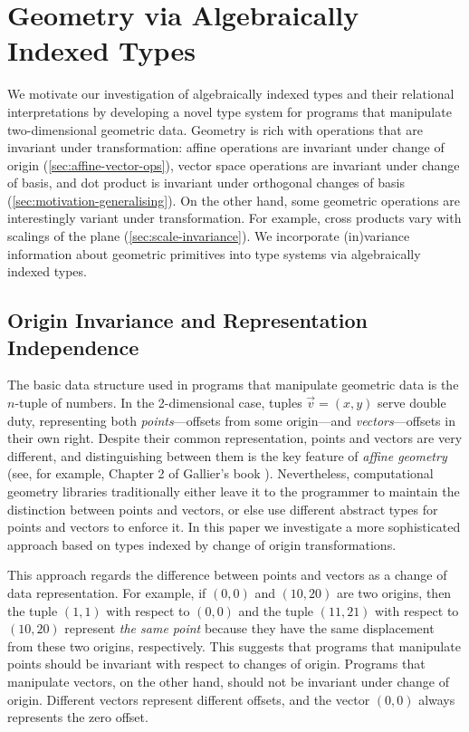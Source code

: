 \section{Geometry via Algebraically Indexed Types}
\label{sec:motivating-examples}

We motivate our investigation of algebraically indexed types and their
relational interpretations by developing a novel type system for
programs that manipulate two-dimensional geometric data. Geometry is
rich with operations that are invariant under transformation: affine
operations are invariant under change of origin
(\autoref{sec:affine-vector-ops}), vector space operations are
invariant under change of basis, and dot product is invariant under
orthogonal changes of basis
(\autoref{sec:motivation-generalising}). On the other hand, some
geometric operations are interestingly variant under transformation.
For example, cross products vary with scalings of the plane
(\autoref{sec:scale-invariance}). We incorporate (in)variance
information about geometric primitives into type systems via
algebraically indexed types.

\subsection{Origin Invariance and Representation Independence}\label{sec:oiri}

The basic data structure used in programs that manipulate geometric data is
the $n$-tuple of numbers. In the 2-dimensional case, tuples 
$\vec{v} = (x,y)$ serve double duty, representing
both \emph{points}---offsets from some origin---and
\emph{vectors}---offsets in their own right.  Despite their common
representation, points and vectors are very different, and
distinguishing between them is the key feature of \emph{affine
  geometry} (see, for example, Chapter 2 of Gallier's book
\cite{gallier11geometric}). Nevertheless, computational geometry
libraries traditionally either leave it to the programmer to maintain
the distinction between points and vectors, or else use different
abstract types for points and vectors to enforce it.
In this paper we investigate a more sophisticated approach based on 
types indexed by change of origin transformations.

This approach regards the difference between points and vectors as a
change of data representation. For example, if $(0,0)$ and $(10,20)$
are two origins, then the tuple $(1,1)$ with respect to $(0,0)$ and the
tuple $(11,21)$ with respect to $(10,20)$ represent \emph{the same
  point} because they have the same displacement from these two
origins, respectively.
This suggests that programs that manipulate points %
should be invariant with respect to changes of
origin. Programs that manipulate vectors, on the other hand, should
not be invariant under change of origin. Different vectors represent
different offsets, and the vector $(0,0)$ always represents the zero
offset.

